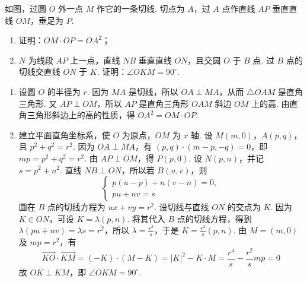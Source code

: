 \begin{problem}
如图，过圆 \(O\) 外一点 \(M\) 作它的一条切线. 切点为 \(A\)，过 \(A\) 点作直线 \(AP\) 垂直直线 \(OM\)，垂足为 \(P\).

\begin{enumerate}
\item 证明：\(OM \cdot OP = OA^2\)；
\item \(N\) 为线段 \(AP\) 上一点，直线 \(NB\) 垂直直线 \(ON\)，且交圆 \(O\) 于 \(B\) 点. 过 \(B\) 点的切线交直线 \(ON\) 于 \(K\). 证明：\(\angle OKM = 90^{\circ}\).
\end{enumerate}

\FloatBarrier

\begin{solution}
\begin{enumerate}
\item 设圆 \(O\) 的半径为 \(r\). 因为 \(MA\) 是切线，所以 \(OA\perp MA\)，从而 \(\triangle OAM\) 是直角三角形. 又 \(AP\perp OM\)，所以 \(AP\) 是直角三角形 \(OAM\) 斜边 \(OM\) 上的高. 由直角三角形斜边上的高的性质，得 \(OA^{2}=OM\cdot OP\).

\item 建立平面直角坐标系，使 \(O\) 为原点，\(OM\) 为 \(x\) 轴. 设 \(M(m,0)\)，\(A(p,q)\)，且 \(p^{2}+q^{2}=r^{2}\). 因为 \(OA\perp MA\)，有 \((p,q)\cdot(m-p,-q)=0\)，即 \(mp=p^{2}+q^{2}=r^{2}\). 由 \(AP\perp OM\)，得 \(P(p,0)\). 设 \(N(p,n)\)，并记 \(s=p^{2}+n^{2}\). 直线 \(NB\perp ON\)，所以若 \(B(u,v)\)，则
\[
\begin{cases}
p(u-p)+n(v-n)=0,\\
pu+nv=s
\end{cases}
\]
圆在 \(B\) 点的切线方程为 \(ux+vy=r^{2}\).
设切线与直线 \(ON\) 的交点为 \(K\). 因为 \(K\in ON\)，可设 \(K=\lambda(p,n)\). 将其代入 \(B\) 点的切线方程，得到
\(\lambda(pu+nv)=\lambda s=r^{2}\)，所以 \(\lambda=\frac{r^{2}}{s}\)，于是 \(K=\frac{r^{2}}{s}(p,n)\).
由 \(M=(m,0)\) 及 \(mp=r^{2}\)，有
\[
\overrightarrow{KO}\cdot\overrightarrow{KM}
=(-K)\cdot(M-K)
=|K|^{2}-K\cdot M
=\frac{r^{4}}{s}-\frac{r^{2}}{s}mp
=0
\]
故 \(OK\perp KM\)，即 \(\angle OKM=90^{\circ}\).
\end{enumerate}
\end{solution}
\end{problem}

